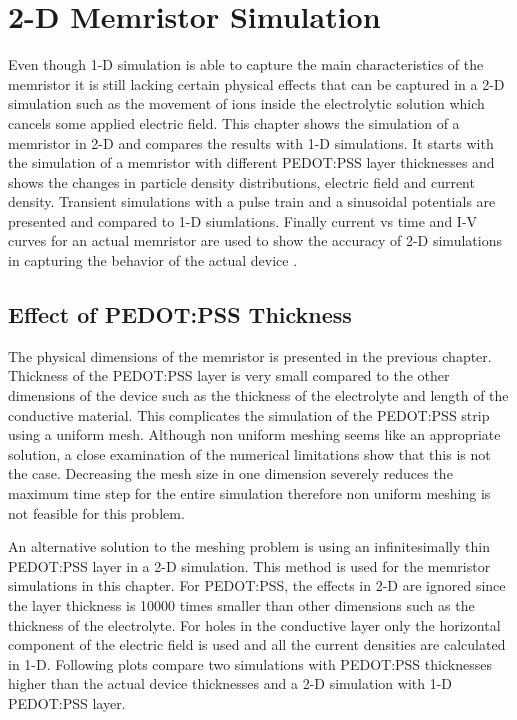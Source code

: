 
\chapter{2-D Memristor Simulation} %

\label{Chapter6} %

\begin{doublespace}

Even though 1-D simulation is able to capture the main characteristics of the memristor it is still lacking certain physical effects that can be captured in a 2-D simulation such as the movement of ions inside the electrolytic solution which cancels some applied electric field. This chapter shows the simulation of a memristor in 2-D and compares the results with 1-D simulations. It starts with the simulation of a memristor with different PEDOT:PSS layer thicknesses and shows the changes in particle density distributions, electric field and current density. 
Transient simulations with a pulse train and a sinusoidal potentials are presented and compared to 1-D siumlations. Finally current vs time and I-V curves for an actual memristor are used to show the accuracy of 2-D simulations in capturing the behavior of the actual device .  

\section{Effect of PEDOT:PSS Thickness}

The physical dimensions of the memristor is presented in the previous chapter. Thickness of the PEDOT:PSS layer is very small compared to the other dimensions of the device such as the thickness of the electrolyte and length of the conductive material. This complicates the simulation of the PEDOT:PSS strip using a uniform mesh. Although non uniform meshing seems like an appropriate solution, a close examination of the numerical limitations show that this is not the case. Decreasing the mesh size in one dimension severely reduces the maximum time step for the entire simulation therefore non uniform meshing is not feasible for this problem. 

An alternative solution to the meshing problem is using an infinitesimally thin PEDOT:PSS layer in a 2-D simulation. This method is used for the memristor simulations in this chapter. For PEDOT:PSS, the effects in 2-D are ignored since the layer thickness is 10000 times smaller than other dimensions such as the thickness of the electrolyte. For holes in the conductive layer only the horizontal component of the electric field is used and all the current densities are calculated in 1-D. Following plots compare two simulations with PEDOT:PSS thicknesses higher than the actual device thicknesses and a 2-D simulation with 1-D PEDOT:PSS layer.  


\end{doublespace}
